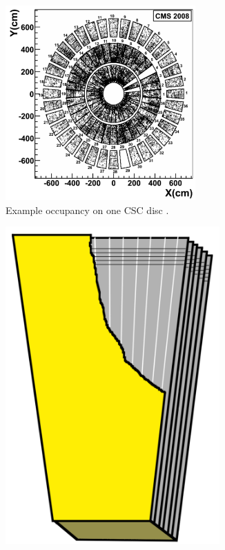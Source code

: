 \begin{figure}[hbp!]
\centering
\begin{subfigure}[c]{0.55\textwidth}
\includegraphics[width=0.8\textwidth]{figs/cscring.png}
\caption[Example occupancy on one CSC disc.]{Example occupancy on one CSC disc \cite{cscperformance}.}
\label{fig:cscring}
\end{subfigure}
\begin{subfigure}[c]{0.3\textwidth}
\includegraphics[width=0.9\textwidth]{figs/cscchamber.png}

\end{subfigure}
\end{figure}
